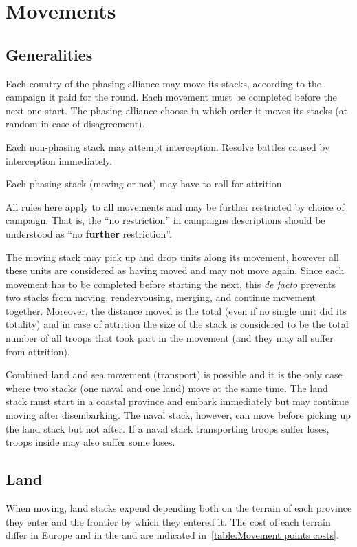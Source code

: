 \section{Movements}
\label{chMilitary:Movements}
\subsection{Generalities}
Each country of the phasing alliance may move its stacks, according to the
campaign it paid for the round. Each movement must be completed before the
next one start. The phasing alliance choose in which order it moves its stacks
(at random in case of disagreement).

Each non-phasing stack may attempt interception. Resolve battles caused by
interception immediately.

Each phasing stack (moving or not) may have to roll for attrition.

All rules here apply to all movements and may be further restricted by choice
of campaign. That is, the ``no restriction'' in campaigns descriptions should
be understood as ``no \textbf{further} restriction''.

The moving stack may pick up and drop units along its movement, however all
these units are considered as having moved and may not move again. Since each
movement has to be completed before starting the next, this \emph{de facto}
prevents two stacks from moving, rendezvousing, merging, and continue movement
together. Moreover, the distance moved is the total (even if no single unit
did its totality) and in case of attrition the size of the stack is considered
to be the total number of all troops that took part in the movement (and they
may all suffer from attrition).

Combined land and sea movement (transport) is possible and it is the only case
where two stacks (one naval and one land) move at the same time. The land
stack must start in a coastal province and embark immediately but may continue
moving after disembarking. The naval stack, however, can move before picking
up the land stack but not after. If a naval stack transporting troops suffer
loses, troops inside may also suffer some loses.

\subsection{Land}
When moving, land stacks expend \MP depending both on the terrain of each
province they enter and the frontier by which they entered it. The cost of
each terrain differ in Europe and in the \ROTW and are indicated
in~\ref{table:Movement points costs}.

